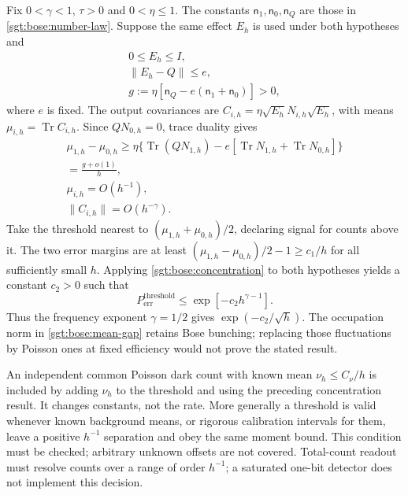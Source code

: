 \documentclass[aps,pra,reprint,superscriptaddress,longbibliography]{revtex4-2}
\newcommand{\Tr}{\operatorname{Tr}}
\begin{document}
Fix $0<\gamma<1$, $\tau>0$ and $0<\eta\le1$.  The constants
$\mathsf n_1,\mathsf n_0,\mathsf n_Q$ are those in \eqref{sgt:bose:number-law}.
Suppose the same effect $E_h$ is used under both hypotheses and
\begin{equation}
\begin{gathered}
 0\le E_h\le I,\\
 \|E_h-Q\|\le e,
 \\
 g:=\eta[\mathsf n_Q-e(\mathsf n_1+\mathsf n_0)]>0,
 \label{sgt:bose:effect-hypothesis}
\end{gathered}
\end{equation}
where $e$ is fixed.  The output covariances are
$C_{i,h}=\eta\sqrt{E_h}N_{i,h}\sqrt{E_h}$, with means
$\mu_{i,h}=\Tr C_{i,h}$.  Since $QN_{0,h}=0$, trace duality gives
\begin{gather}
 \mu_{1,h}-\mu_{0,h}
 \ge\eta\{\Tr(QN_{1,h})-e[\Tr N_{1,h}+\Tr N_{0,h}]\}
\\
   =\frac{g+o(1)}h,\nonumber\\
 \mu_{i,h}=O(h^{-1}),\\
 \|C_{i,h}\|=O(h^{-\gamma}).
 \label{sgt:bose:mean-gap}
\end{gather}
Take the threshold nearest to
$(\mu_{1,h}+\mu_{0,h})/2$, declaring signal for counts above it.
The two error margins are at least
$(\mu_{1,h}-\mu_{0,h})/2-1\ge c_1/h$ for all sufficiently small $h$.
Applying \eqref{sgt:bose:concentration} to both hypotheses yields a
constant $c_2>0$ such that
\begin{equation}
 P_{\mathrm{err}}^{\mathrm{threshold}}
      \le\exp[-c_2h^{\gamma-1}].
 \label{sgt:bose:unfiltered-rate}
\end{equation}
Thus the frequency exponent $\gamma=1/2$ gives
$\exp(-c_2/\sqrt h)$.  The occupation norm in
\eqref{sgt:bose:mean-gap} retains Bose bunching; replacing those
fluctuations by Poisson ones at fixed efficiency would not prove the
stated result.

An independent common Poisson dark count with known mean
$\nu_h\le C_\nu/h$ is included by adding $\nu_h$ to the threshold and
using the preceding concentration result.  It changes constants, not
the rate.  More generally a threshold is valid whenever known background
means, or rigorous calibration intervals for them, leave a positive
$h^{-1}$ separation and obey the same moment bound.  This condition
must be checked; arbitrary unknown offsets are not covered.  Total-count
readout must resolve counts over a range of order $h^{-1}$; a saturated
one-bit detector does not implement this decision.
\end{document}
